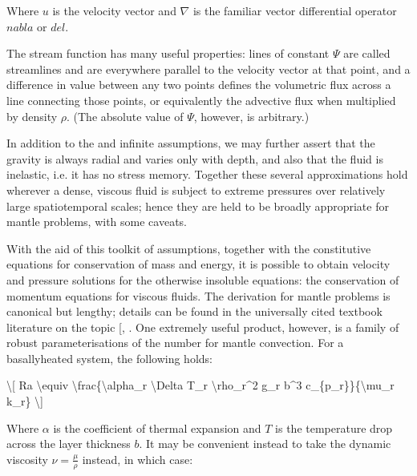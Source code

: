 \documentclass[letterpaper,10pt,english]{jupyterBook}
\begin{document}
\sphinxAtStartPar
Where \(u\) is the velocity vector and \(\nabla\) is the familiar vector differential operator \(nabla\) or \(del\).

\sphinxAtStartPar
The stream function has many useful properties: lines of constant \(\Psi\) are called streamlines and are everywhere parallel to the velocity vector at that point, and a difference in value between any two points defines the volumetric flux across a line connecting those points, or equivalently the advective flux when multiplied by density \(\rho\). (The absolute value of \(\Psi\), however, is arbitrary.)

\sphinxAtStartPar
In addition to the  and infinite  assumptions, we may further assert that the gravity is always radial and varies only with depth, and also that the fluid is inelastic, i.e. it has no stress memory. Together these several approximations hold wherever a dense, viscous fluid is subject to extreme pressures over relatively large spatio\sphinxhyphen{}temporal scales; hence they are held to be broadly appropriate for mantle problems, with some caveats.

\sphinxAtStartPar
With the aid of this toolkit of assumptions, together with the constitutive equations for conservation of mass and energy, it is possible to obtain velocity and pressure solutions for the otherwise insoluble  equations: the conservation of momentum equations for viscous fluids. The derivation for mantle problems is canonical but lengthy; details can be found in the universally cited textbook literature on the topic {[}, \sphinxcite{references:id88}{]}. One extremely useful product, however, is a family of robust parameterisations of the  number for mantle convection. For a basally\sphinxhyphen{}heated system, the following holds:

\sphinxAtStartPar
\textbackslash{}{[} Ra \textbackslash{}equiv \textbackslash{}frac\{\textbackslash{}alpha\_r \textbackslash{}Delta T\_r \textbackslash{}rho\_r\textasciicircum{}2 g\_r b\textasciicircum{}3 c\_\{p\_r\}\}\{\textbackslash{}mu\_r k\_r\} \textbackslash{}{]}

\sphinxAtStartPar
Where \(\alpha\) is the coefficient of thermal expansion and \(T\) is the temperature drop across the layer thickness \(b\). It may be convenient instead to take the dynamic viscosity \(\nu=\frac{\mu}{\rho}\) instead, in which case:
\end{document}
